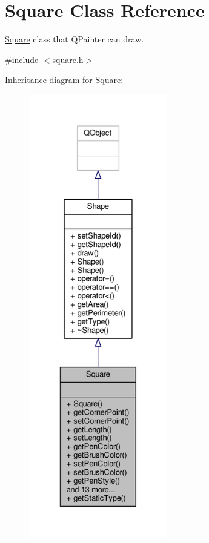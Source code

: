 \hypertarget{classSquare}{}\section{Square Class Reference}
\label{classSquare}


\hyperlink{classSquare}{Square} class that Q\+Painter can draw.  




{\ttfamily \#include $<$square.\+h$>$}



Inheritance diagram for Square\+:\nopagebreak
\begin{figure}[H]
\begin{center}
\leavevmode
\includegraphics[height=550pt]{classSquare__inherit__graph}
\end{center}
\end{figure}


